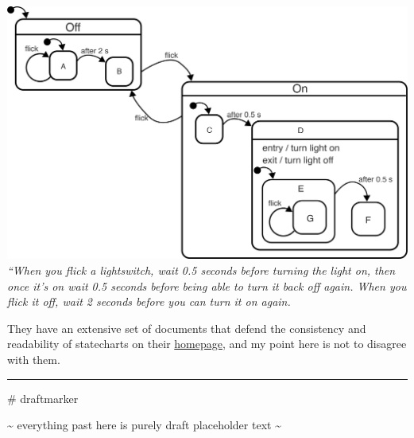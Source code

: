 \documentclass[10pt]{article}
\begin{document}
\begin{multicols}{2}
\includegraphics[width=\linewidth]{../assets/images/on-off-delayed-exit-1.png}
\emph{``When you flick a lightswitch, wait 0.5 seconds before turning
the light on, then once it's on wait 0.5 seconds before being able to
turn it back off again. When you flick it off, wait 2 seconds before you
can turn it on again.}

They have an extensive set of documents that defend the consistency and
readability of statecharts on their
\href{https://statecharts.dev/}{homepage}, and my point here is not to
disagree with them.

\begin{center}\rule{0.5\linewidth}{0.5pt}\end{center}

\hypertarget{draftmarker}{}
\# draftmarker

\textasciitilde{} everything past here is purely draft placeholder text
\textasciitilde{}


\end{multicols}
\end{document}
